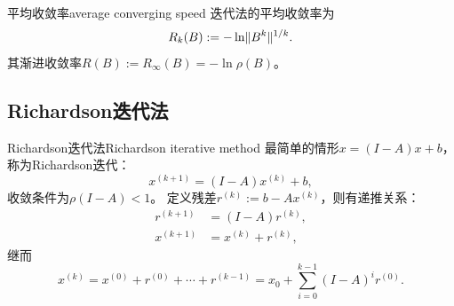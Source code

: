 \begin{definition}
    {平均收敛率}{average converging speed}
    迭代法的平均收敛率为
    \begin{equation}
        R_k(B) := -\ln\lVert B^k\rVert^{1/k}.
    \end{equation}
    其渐进收敛率$R(B) := R_\infty(B) = -\ln\rho(B)$。
\end{definition}


\subsection{Richardson迭代法}

\begin{example}
    {Richardson迭代法}{Richardson iterative method}
    最简单的情形$x = (I - A)x + b$，称为Richardson迭代：
    \begin{equation}
        x^{(k+1)} = (I - A)x^{(k)} + b,
    \end{equation}
    收敛条件为$\rho(I - A) < 1$。
    定义残差$r^{(k)} := b - Ax^{(k)}$，则有递推关系：
    \begin{subequations}\label{eq:na-richardson-residual-update}
        \begin{align}
            r^{(k+1)} &= (I - A)r^{(k)},\\
            x^{(k+1)} &= x^{(k)} + r^{(k)},
        \end{align}
    \end{subequations}
    继而
    \[
        x^{(k)} = x^{(0)} + r^{(0)} + \cdots + r^{(k-1)} = x_0 + \sum_{i=0}^{k-1}(I - A)^ir^{(0)}.
    \]
\end{example}


